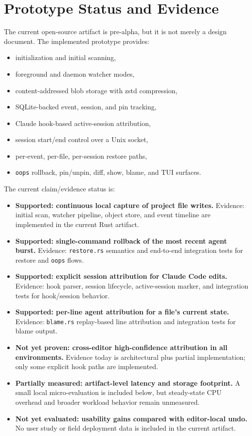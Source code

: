 \documentclass[10pt,a4paper]{article}
\begin{document}
\section{Prototype Status and Evidence}

The current open-source artifact is pre-alpha, but it is not merely a design
document. The implemented prototype provides:

\begin{itemize}
  \item initialization and initial scanning,
  \item foreground and daemon watcher modes,
  \item content-addressed blob storage with zstd compression,
  \item SQLite-backed event, session, and pin tracking,
  \item Claude hook-based active-session attribution,
  \item session start/end control over a Unix socket,
  \item per-event, per-file, per-session restore paths,
  \item \texttt{oops} rollback, pin/unpin, diff, show, blame, and TUI surfaces.
\end{itemize}

The current claim/evidence status is:

\begin{itemize}
  \item \textbf{Supported: continuous local capture of project file writes.}
  Evidence: initial scan, watcher pipeline, object store, and event timeline
  are implemented in the current Rust artifact.
  \item \textbf{Supported: single-command rollback of the most recent agent burst.}
  Evidence: \texttt{restore.rs} semantics and end-to-end integration tests for
  restore and \texttt{oops} flows.
  \item \textbf{Supported: explicit session attribution for Claude Code edits.}
  Evidence: hook parser, session lifecycle, active-session marker, and
  integration tests for hook/session behavior.
  \item \textbf{Supported: per-line agent attribution for a file's current state.}
  Evidence: \texttt{blame.rs} replay-based line attribution and integration
  tests for blame output.
  \item \textbf{Not yet proven: cross-editor high-confidence attribution in all environments.}
  Evidence today is architectural plus partial implementation; only some
  explicit hook paths are implemented.
  \item \textbf{Partially measured: artifact-level latency and storage footprint.}
  A small local micro-evaluation is included below, but steady-state CPU
  overhead and broader workload behavior remain unmeasured.
  \item \textbf{Not yet evaluated: usability gains compared with editor-local undo.}
  No user study or field deployment data is included in the current artifact.
\end{itemize}
\end{document}
